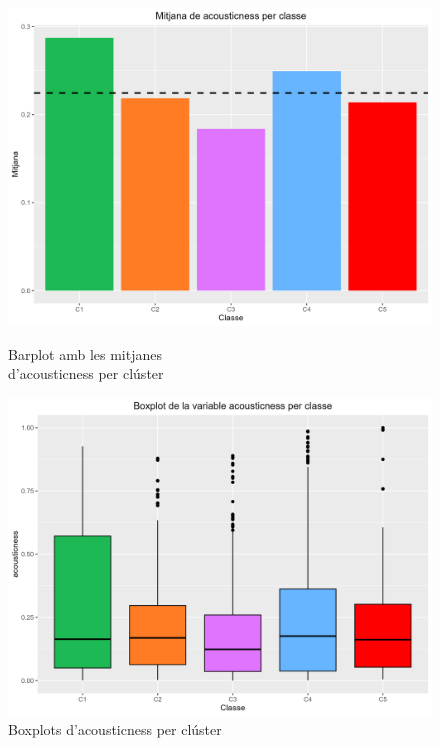 \documentclass{article}
\begin{document}
\begin{figure}[H]
\centering
    \begin{minipage}{.49\textwidth}
        \centering
        \includegraphics[width=0.95\linewidth]{Images/5_Profiling/numeriques/Num_BarPlot_acousticness.png}
        \caption{Barplot amb les mitjanes \\ d'acousticness per clúster}
        \label{fig:Num_BarPlot_acousticness}
    \end{minipage}%
    \begin{minipage}{.49\textwidth}
        \centering
        \includegraphics[width=0.95\linewidth]{Images/5_Profiling/numeriques/Num_BoxPlot_acousticness.png}
        \caption{Boxplots d'acousticness per clúster}
        \label{fig:Num_BoxPlot_acousticness}
    \end{minipage}%
\end{figure}
\end{document}
